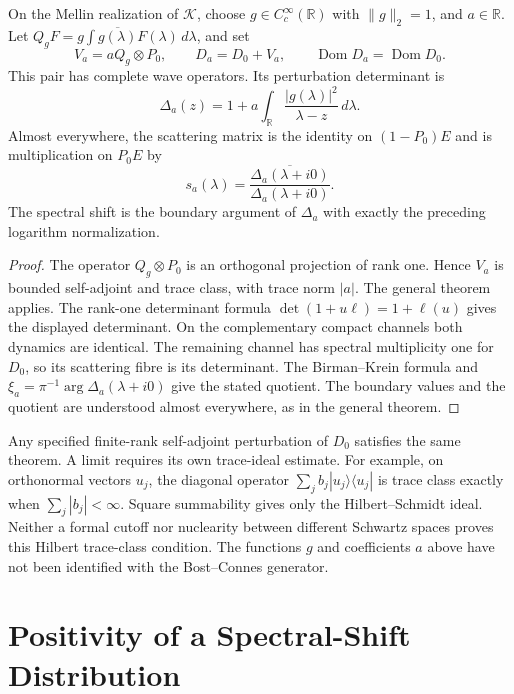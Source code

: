 \begin{proposition}
\label{v4-arith:w7-j:prop:wave-existence}
On the Mellin realization of \(\mathcal K\), choose
\(g\in C_c^\infty(\mathbb R)\) with \(\|g\|_2=1\), and \(a\in\mathbb R\).
Let \(Q_gF=g\int\overline{g(\lambda)}F(\lambda)\,d\lambda\), and set
\[
 V_a=aQ_g\otimes P_0,\qquad D_a=D_0+V_a,
 \qquad\operatorname{Dom}D_a=\operatorname{Dom}D_0.
\]
This pair has complete wave operators. Its perturbation determinant is
\[
 \Delta_a(z)=1+a\int_{\mathbb R}
 \frac{|g(\lambda)|^2}{\lambda-z}\,d\lambda.
\]
Almost everywhere, the scattering matrix is the identity on
\((1-P_0)E\) and is multiplication on \(P_0E\) by
\[
 s_a(\lambda)=
 \frac{\overline{\Delta_a(\lambda+i0)}}{\Delta_a(\lambda+i0)}.
\]
The spectral shift is the boundary argument of \(\Delta_a\) with
exactly the preceding logarithm normalization.
\end{proposition}
\begin{proof}
The operator \(Q_g\otimes P_0\) is an orthogonal projection of
rank one. Hence \(V_a\) is bounded self-adjoint and trace class,
with trace norm \(|a|\). The general theorem applies.
The rank-one determinant formula \(\det(1+u\ell)=1+\ell(u)\)
gives the displayed determinant. On the complementary compact
channels both dynamics are identical. The remaining channel has
spectral multiplicity one for \(D_0\), so its scattering fibre
is its determinant. The Birman--Krein formula and
\(\xi_a=\pi^{-1}\arg\Delta_a(\lambda+i0)\) give the stated quotient.
The boundary values and the quotient are understood almost
everywhere, as in the general theorem.
\end{proof}

\begin{remark}
\label{v4-arith:w7-j:rem:trace-class-domain}
Any specified finite-rank self-adjoint perturbation of \(D_0\)
satisfies the same theorem. A limit requires its own trace-ideal
estimate. For example, on orthonormal vectors \(u_j\), the diagonal
operator \(\sum_j b_j|u_j\rangle\langle u_j|\) is trace class exactly
when \(\sum_j|b_j|<\infty\). Square summability gives only the
Hilbert--Schmidt ideal. Neither a formal cutoff nor nuclearity
between different Schwartz spaces proves this Hilbert trace-class
condition. The functions \(g\) and coefficients \(a\) above have
not been identified with the Bost--Connes generator.
\end{remark}

\section{Positivity of a Spectral-Shift Distribution}
\label{v4-arith:w7-j:reformulation:ATP-unitarity}


